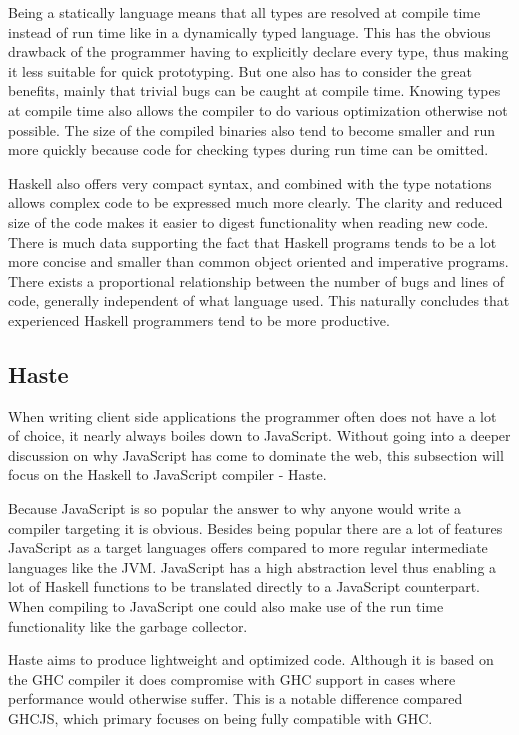 \documentclass[a4paper]{article}
\begin{document}
Being a statically language means that all types are resolved at compile time instead of run time like in a dynamically typed language. This has the obvious drawback of the programmer having to explicitly declare every type, thus making it less suitable for quick prototyping. But one also has to consider the great benefits, mainly that trivial bugs can be caught at compile time. Knowing types at compile time also allows the compiler to do various optimization otherwise not possible. The size of the compiled binaries also tend to become smaller and run more quickly because code for checking types during run time can be omitted.

Haskell also offers very compact syntax, and combined with the type notations allows complex code to be expressed much more clearly. The clarity and reduced size of the code makes it easier to digest functionality when reading new code. There is much data supporting the fact that Haskell programs tends to be a lot more concise and smaller than common object oriented and imperative programs. There exists a proportional relationship between the number of bugs and lines of code, generally independent of what language used. This naturally concludes that experienced Haskell programmers tend to be more productive.



\subsection{Haste}
When writing client side applications the programmer often does not have a lot of choice, it nearly always boiles down to JavaScript. Without going into a deeper discussion on why JavaScript has come to dominate the web, this subsection will focus on the Haskell to JavaScript compiler - Haste.

Because JavaScript is so popular the answer to why anyone would write a compiler targeting it is obvious. Besides being popular there are a lot of features JavaScript as a target languages offers compared to more regular
intermediate languages like the JVM. JavaScript has a high abstraction level thus enabling a lot of Haskell functions to be translated directly to a JavaScript counterpart. When compiling to JavaScript one could also make use
of the run time functionality like the garbage collector.

Haste aims to produce lightweight and optimized code. Although it is based
on the GHC compiler it does compromise with GHC support in cases where performance would otherwise suffer. This is a notable
difference compared GHCJS, which primary focuses on being fully compatible with GHC.
\end{document}
